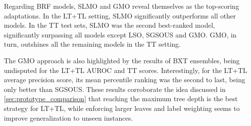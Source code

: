 Regarding BRF models, SLMO and GMO reveal themselves as the top-scoring adaptations. In the LT+TL setting, SLMO significantly outperforms all other models. In the TT test sets, SLMO was the second best-ranked model, significantly surpassing all models except LSO, SGSOUS and GMO. GMO, in turn, outshines all the remaining models in the TT setting.

The GMO approach is also highlighted by the results of BXT ensembles, being undisputed for the LT+TL AUROC and TT scores. Interestingly, for the LT+TL average precision score, its mean percentile ranking was the second to last, being only better than SGSOUS. These results corroborate the idea discussed in \autoref{sec:prototype_comparison} that reaching the maximum tree depth is the best strategy for LT+TL, while enforcing larger leaves and label weighting seems to improve generalization to unseen instances.





